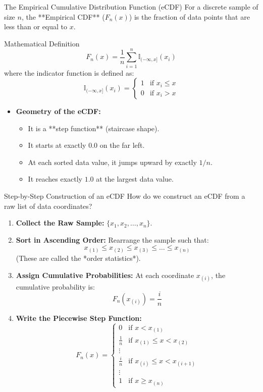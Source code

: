 \documentclass[9pt]{beamer}
\begin{document}
\begin{frame}{The Empirical Cumulative Distribution Function (eCDF)}
  For a discrete sample of size $n$, the **Empirical CDF** ($F_n(x)$) is the fraction of data points that are less than or equal to $x$.
  \begin{block}{Mathematical Definition}
    $$F_n(x) = \frac{1}{n} \sum_{i=1}^n \mathbb{I}_{(-\infty, x]}(x_i)$$
    where the indicator function is defined as:
    $$\mathbb{I}_{(-\infty, x]}(x_i) = \begin{cases} 1 & \text{if } x_i \le x \\ 0 & \text{if } x_i > x \end{cases}$$
  \end{block}
  \begin{itemize}
    \item \textbf{Geometry of the eCDF:}
      \begin{itemize}
        \item It is a **step function** (staircase shape).
        \item It starts at exactly $0.0$ on the far left.
        \item At each sorted data value, it jumps upward by exactly $1/n$.
        \item It reaches exactly $1.0$ at the largest data value.
      \end{itemize}
  \end{itemize}
\end{frame}

\begin{frame}{Step-by-Step Construction of an eCDF}
  How do we construct an eCDF from a raw list of data coordinates?
  \begin{enumerate}
    \item \textbf{Collect the Raw Sample:} $\{x_1, x_2, \dots, x_n\}$.
    \item \textbf{Sort in Ascending Order:} Rearrange the sample such that:
      $$x_{(1)} \le x_{(2)} \le x_{(3)} \le \dots \le x_{(n)}$$
      (These are called the *order statistics*).
    \item \textbf{Assign Cumulative Probabilities:}
      At each coordinate $x_{(i)}$, the cumulative probability is:
      $$F_n(x_{(i)}) = \frac{i}{n}$$
    \item \textbf{Write the Piecewise Step Function:}
      $$F_n(x) = \begin{cases} 
        0 & \text{if } x < x_{(1)} \\
        \frac{1}{n} & \text{if } x_{(1)} \le x < x_{(2)} \\
        \vdots & \\
        \frac{i}{n} & \text{if } x_{(i)} \le x < x_{(i+1)} \\
        \vdots & \\
        1 & \text{if } x \ge x_{(n)}
      \end{cases}$$
  \end{enumerate}
\end{frame}
\end{document}
